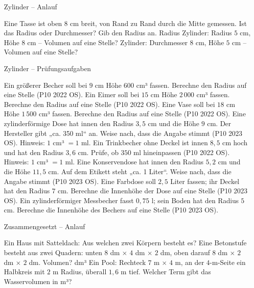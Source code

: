 \begin{aufgabe}{Zylinder – Anlauf}
\begin{teile}
\teil Eine Tasse ist oben $8$ cm breit, von Rand zu Rand durch die Mitte gemessen. Ist das Radius oder Durchmesser? Gib den Radius an. Radius \leerfeld[cm]
\teil Zylinder: Radius $5$ cm, Höhe $8$ cm – Volumen auf eine Stelle? \leerfeld[cm³]
\teil Zylinder: Durchmesser $8$ cm, Höhe $5$ cm – Volumen auf eine Stelle? \leerfeld[cm³]
\end{teile}
\end{aufgabe}

\begin{aufgabe}{Zylinder – Prüfungsaufgaben}
\begin{teile}
\steil Ein größerer Becher soll bei $9$ cm Höhe $600$ cm³ fassen. Berechne den Radius auf eine Stelle \hfill (P10 2022 OS). \leerfeld[cm]
\steil Ein Eimer soll bei $15$ cm Höhe $2\,000$ cm³ fassen. Berechne den Radius auf eine Stelle \hfill (P10 2022 OS). \leerfeld[cm]
\steil Eine Vase soll bei $18$ cm Höhe $1\,500$ cm³ fassen. Berechne den Radius auf eine Stelle \hfill (P10 2022 OS). \leerfeld[cm]
\teil Eine zylinderförmige Dose hat innen den Radius $3{,}5$ cm und die Höhe $9$ cm. Der Hersteller gibt „ca. 350 ml“ an. Weise nach, dass die Angabe stimmt \hfill (P10 2023 OS). Hinweis: $1$ cm³ $= 1$ ml.
\teil Ein Trinkbecher ohne Deckel ist innen $8{,}5$ cm hoch und hat den Radius $3{,}6$ cm. Prüfe, ob $350$ ml hineinpassen \hfill (P10 2022 OS). Hinweis: $1$ cm³ $= 1$ ml.
\teil Eine Konservendose hat innen den Radius $5{,}2$ cm und die Höhe $11{,}5$ cm. Auf dem Etikett steht „ca. 1 Liter“. Weise nach, dass die Angabe stimmt \hfill (P10 2023 OS).
\steil Eine Farbdose soll $2{,}5$ Liter fassen; ihr Deckel hat den Radius $7$ cm. Berechne die Innenhöhe der Dose auf eine Stelle \hfill (P10 2023 OS). \leerfeld[cm]
\steil Ein zylinderförmiger Messbecher fasst $0{,}75$ l; sein Boden hat den Radius $5$ cm. Berechne die Innenhöhe des Bechers auf eine Stelle \hfill (P10 2023 OS). \leerfeld[cm]
\end{teile}
\end{aufgabe}

\begin{aufgabe}{Zusammengesetzt – Anlauf}
\begin{teile}
\teil Ein Haus mit Satteldach: Aus welchen zwei Körpern besteht es?
\teil Eine Betonstufe besteht aus zwei Quadern: unten $8$ dm × $4$ dm × $2$ dm, oben darauf $8$ dm × $2$ dm × $2$ dm. Volumen? \leerfeld dm³
\teil Ein Pool: Rechteck $7$ m × $4$ m, an der $4$-m-Seite ein Halbkreis mit $2$ m Radius, überall $1{,}6$ m tief. Welcher Term gibt das Wasservolumen in m³? \\  \\  \\ 
\end{teile}
\end{aufgabe}

